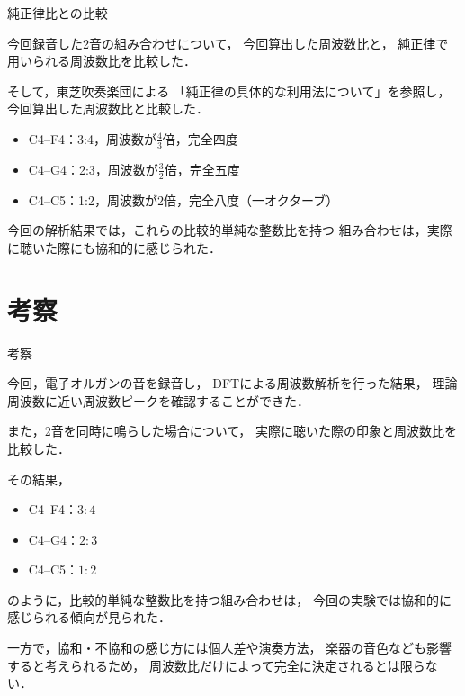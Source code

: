 \documentclass[dvipdfmx,uplatex]{beamer}
\begin{document}
\begin{frame}{純正律比との比較}

  今回録音した2音の組み合わせについて，
  今回算出した周波数比と，
  純正律で用いられる周波数比を比較した．

  そして，東芝吹奏楽団による
  「純正律の具体的な利用法について」\cite{junseiritu}を参照し，
  今回算出した周波数比と比較した．

  \begin{itemize}

    \item C4--F4：3:4，周波数が$\frac{4}{3}$倍，完全四度

    \item C4--G4：2:3，周波数が$\frac{3}{2}$倍，完全五度

    \item C4--C5：1:2，周波数が$2$倍，完全八度（一オクターブ）

  \end{itemize}

  今回の解析結果では，これらの比較的単純な整数比を持つ
  組み合わせは，実際に聴いた際にも協和的に感じられた．

\end{frame}

\section{考察}

\begin{frame}{考察}

  今回，電子オルガンの音を録音し，
  DFTによる周波数解析を行った結果，
  理論周波数に近い周波数ピークを確認することができた．

  また，2音を同時に鳴らした場合について，
  実際に聴いた際の印象と周波数比を比較した．

  その結果，

  \begin{itemize}

    \item C4--F4：$3:4$

    \item C4--G4：$2:3$

    \item C4--C5：$1:2$

  \end{itemize}

  のように，比較的単純な整数比を持つ組み合わせは，
  今回の実験では協和的に感じられる傾向が見られた．

  一方で，協和・不協和の感じ方には個人差や演奏方法，
  楽器の音色なども影響すると考えられるため，
  周波数比だけによって完全に決定されるとは限らない．

\end{frame}
\end{document}
